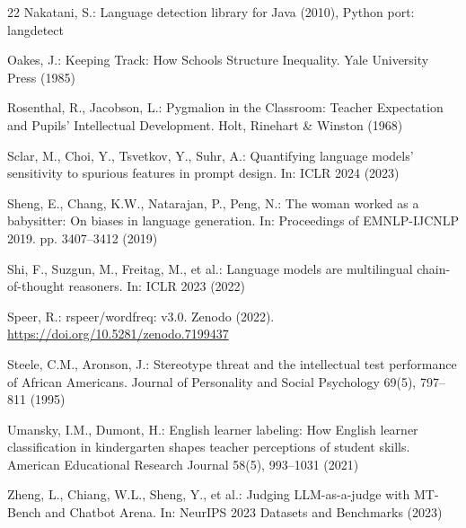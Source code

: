 \documentclass[runningheads]{llncs}
\begin{document}
\begin{thebibliography}{22}
 Nakatani, S.: Language detection library for Java (2010), Python port: langdetect

 Oakes, J.: Keeping Track: How Schools Structure Inequality. Yale University Press (1985)

 Rosenthal, R., Jacobson, L.: Pygmalion in the Classroom: Teacher Expectation and Pupils' Intellectual Development. Holt, Rinehart \& Winston (1968)

 Sclar, M., Choi, Y., Tsvetkov, Y., Suhr, A.: Quantifying language models' sensitivity to spurious features in prompt design. In: ICLR 2024 (2023)

 Sheng, E., Chang, K.W., Natarajan, P., Peng, N.: The woman worked as a babysitter: On biases in language generation. In: Proceedings of EMNLP-IJCNLP 2019. pp. 3407--3412 (2019)

 Shi, F., Suzgun, M., Freitag, M., et al.: Language models are multilingual chain-of-thought reasoners. In: ICLR 2023 (2022)

 Speer, R.: rspeer/wordfreq: v3.0. Zenodo (2022). \url{https://doi.org/10.5281/zenodo.7199437}

 Steele, C.M., Aronson, J.: Stereotype threat and the intellectual test performance of African Americans. Journal of Personality and Social Psychology 69(5), 797--811 (1995)

 Umansky, I.M., Dumont, H.: English learner labeling: How English learner classification in kindergarten shapes teacher perceptions of student skills. American Educational Research Journal 58(5), 993--1031 (2021)

 Zheng, L., Chiang, W.L., Sheng, Y., et al.: Judging LLM-as-a-judge with MT-Bench and Chatbot Arena. In: NeurIPS 2023 Datasets and Benchmarks (2023)

\end{thebibliography}
\end{document}
